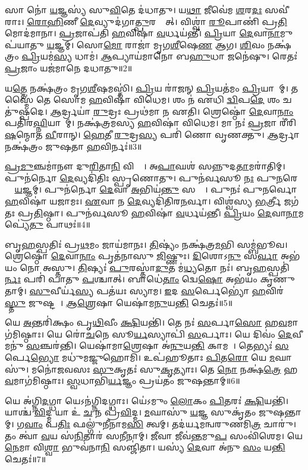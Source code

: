 𑌸𑌾 𑌨𑍋॑ \ul{𑌯}𑌜𑍍𑌞𑌸𑍍𑌯॑ 𑌸𑍁\ul{𑌵𑌿}𑌤𑍇 𑌦॑𑌧𑌾𑌤𑍁।
𑌯\ul{𑌥𑌾} 𑌜𑍀𑌵𑍇॑𑌮 \ul{𑌶}𑌰\ul{𑌦𑌃} 𑌸𑌵𑍀॑𑌰𑌾𑌃।
\ul{𑌰𑍋}\ul{𑌹𑌿}𑌣𑍀 \ul{𑌦𑍇}𑌵𑍍𑌯𑍁𑌦॑𑌗𑌾\ul{𑌤𑍍𑌪𑍁}𑌰𑌸𑍍𑌤𑌾᳚𑌤𑍍।
𑌵𑌿𑌶𑍍𑌵𑌾॑ \ul{𑌰𑍂}𑌪𑌾𑌣𑌿॑ 𑌪𑍍𑌰\ul{𑌤𑌿}𑌮𑍋𑌦॑𑌮𑌾𑌨𑌾।
\ul{𑌪𑍍𑌰}𑌜𑌾𑌪॑𑌤𑌿 \ul{𑌹}𑌵𑌿𑌷𑌾॑ \ul{𑌵}𑌰𑍍𑌧𑌯॑𑌨𑍍𑌤𑍀।
\ul{𑌪𑍍𑌰𑌿}𑌯𑌾 \ul{𑌦𑍇}𑌵𑌾\ul{𑌨𑌾}𑌮𑍁𑌪॑𑌯𑌾𑌤𑍁 \ul{𑌯}𑌜𑍍𑌞𑌮𑍍।
𑌸𑍋\ul{𑌮𑍋} 𑌰𑌾𑌜𑌾॑ 𑌮𑍃𑌗\ul{𑌶𑍀}\ar{}𑌷𑍇\ul{𑌣} 𑌆𑌗\sn{}।
\ul{𑌶𑌿}𑌵𑌂 𑌨𑌕𑍍𑌷॑𑌤𑍍𑌰𑌂 \ul{𑌪𑍍𑌰𑌿}𑌯𑌮॑\ul{𑌸𑍍𑌯} 𑌧𑌾𑌮॑।
\ul{𑌆}𑌪𑍍𑌯𑌾𑌯॑𑌮𑌾𑌨𑍋 𑌬\ul{𑌹𑍁}𑌧𑌾 𑌜𑌨𑍇॑𑌷𑍁।
𑌰𑍇𑌤𑌃॑ \ul{𑌪𑍍𑌰}𑌜𑌾𑌂 𑌯𑌜॑𑌮𑌾𑌨𑍇 𑌦𑌧𑌾𑌤𑍁॥2॥

𑌯\ul{𑌤𑍍𑌤𑍇} 𑌨𑌕𑍍𑌷॑𑌤𑍍𑌰𑌂 𑌮𑍃𑌗\ul{𑌶𑍀}\ar{}𑌷𑌮𑌸𑍍𑌤𑌿॑।
\ul{𑌪𑍍𑌰𑌿}𑌯 𑌰𑌾॑𑌜𑌨𑍍 \ul{𑌪𑍍𑌰𑌿}𑌯𑌤॑𑌮𑌂 \ul{𑌪𑍍𑌰𑌿}𑌯𑌾𑌣𑌾᳚𑌮𑍍।
𑌤𑌸𑍍𑌮𑍈॑ 𑌤𑍇 𑌸𑍋𑌮 \ul{𑌹}𑌵𑌿𑌷𑌾॑ 𑌵𑌿𑌧𑍇𑌮।
𑌶𑌂 𑌨॑ 𑌏𑌧𑌿 \ul{𑌦𑍍𑌵𑌿}𑌪\ul{𑌦𑍇} 𑌶𑌂 𑌚𑌤𑍁॑𑌷𑍍𑌪𑌦𑍇।
\ul{𑌆}𑌰𑍍𑌦𑍍𑌰𑌯𑌾॑ \ul{𑌰𑍁}𑌦𑍍𑌰𑌃 𑌪𑍍𑌰𑌥॑𑌮𑌾 𑌨 𑌏𑌤𑌿।
𑌶𑍍𑌰𑍇𑌷𑍍𑌠𑍋॑ \ul{𑌦𑍇}𑌵𑌾\ul{𑌨𑌾𑌂} 𑌪𑌤𑌿॑𑌰\ul{𑌘𑍍𑌨𑌿}𑌯𑌾𑌨𑌾᳚𑌮𑍍।
𑌨𑌕𑍍𑌷॑𑌤𑍍𑌰𑌮𑌸𑍍𑌯 \ul{𑌹}𑌵𑌿𑌷𑌾॑ 𑌵𑌿𑌧𑍇𑌮।
𑌮𑌾 𑌨𑌃॑ \ul{𑌪𑍍𑌰}𑌜𑌾 𑌰𑍀॑𑌰𑌿\ul{𑌷}𑌨𑍍𑌮𑍋𑌤 \ul{𑌵𑍀}𑌰𑌾𑌨𑍍।
\ul{𑌹𑍇}𑌤𑍀 \ul{𑌰𑍁}𑌦𑍍𑌰\ul{𑌸𑍍𑌯} 𑌪𑌰𑌿॑ 𑌣𑍋 𑌵𑍃𑌣𑌕𑍍𑌤𑍁।
\ul{𑌆}𑌰𑍍𑌦𑍍𑌰𑌾 𑌨𑌕𑍍𑌷॑𑌤𑍍𑌰𑌂 𑌜𑍁𑌷𑌤𑌾 \ul{𑌹}𑌵𑌿𑌰𑍍𑌨𑌃॑॥3॥

\ul{𑌪𑍍𑌰}\ul{𑌮𑍁}𑌞𑍍𑌚𑌮𑌾॑𑌨𑍗 𑌦𑍁\ul{𑌰𑌿}𑌤𑌾\ul{𑌨𑌿} 𑌵𑌿𑌶𑍍𑌵𑌾᳚।
𑌅\ul{𑌪𑌾}𑌘𑌶॑ 𑌸𑌨𑍍𑌨𑍁𑌦\ul{𑌤𑌾}𑌮𑌰𑌾॑𑌤𑌿𑌮𑍍।
𑌪𑍁𑌨॑𑌰𑍍𑌨𑍋 \ul{𑌦𑍇}𑌵𑍍𑌯𑌦𑌿॑𑌤𑌿𑌃 𑌸𑍍𑌪𑍃𑌣𑍋𑌤𑍁।
𑌪𑍁𑌨॑𑌰𑍍𑌵𑌸𑍂 \ul{𑌨𑌃} 𑌪𑍁\ul{𑌨}𑌰𑍇𑌤𑌾𑌂᳚ \ul{𑌯}𑌜𑍍𑌞𑌮𑍍।
𑌪𑍁𑌨॑𑌰𑍍𑌨𑍋 \ul{𑌦𑍇}𑌵𑌾 \ul{𑌅}𑌭𑌿𑌯॑\ul{𑌨𑍍𑌤𑍁} 𑌸𑌰𑍍𑌵𑍇᳚।
𑌪𑍁𑌨𑌃॑ 𑌪𑍁𑌨𑌰𑍍𑌵𑍋 \ul{𑌹}𑌵𑌿𑌷𑌾॑ 𑌯𑌜𑌾𑌮𑌃।
\ul{𑌏}𑌵𑌾 𑌨 \ul{𑌦𑍇}𑌵𑍍𑌯𑌦𑌿॑𑌤𑌿𑌰\ul{𑌨}𑌰𑍍𑌵𑌾।
𑌵𑌿𑌶𑍍𑌵॑𑌸𑍍𑌯 \ul{𑌭}𑌰𑍍𑌤𑍍𑌰𑍀 𑌜𑌗॑𑌤𑌃 𑌪𑍍𑌰\ul{𑌤𑌿}𑌷𑍍𑌠𑌾।
𑌪𑍁𑌨॑𑌰𑍍𑌵𑌸𑍂 \ul{𑌹}𑌵𑌿𑌷𑌾॑ \ul{𑌵}𑌰𑍍𑌧𑌯॑𑌨𑍍𑌤𑍀।
\ul{𑌪𑍍𑌰𑌿}𑌯𑌂 \ul{𑌦𑍇}𑌵𑌾\ul{𑌨𑌾}𑌮𑌪𑍍𑌯𑍇॑\ul{𑌤𑍁} 𑌪𑌾𑌥𑌃॑॥4॥

𑌬𑍃\ul{𑌹}𑌸𑍍𑌪𑌤𑌿𑌃॑ 𑌪𑍍𑌰\ul{𑌥}𑌮𑌂 𑌜𑌾𑌯॑𑌮𑌾𑌨𑌃।
\ul{𑌤𑌿}𑌷𑍍𑌯𑌂॑ 𑌨𑌕𑍍𑌷॑𑌤𑍍𑌰\ul{𑌮}𑌭𑌿 𑌸𑌮𑍍𑌬॑𑌭𑍂𑌵।
𑌶𑍍𑌰𑍇𑌷𑍍𑌠𑍋॑ \ul{𑌦𑍇}𑌵𑌾\ul{𑌨𑌾𑌂} 𑌪𑍃𑌤॑𑌨𑌾𑌸𑍁 \ul{𑌜𑌿}𑌷𑍍𑌣𑍁𑌃।
\ul{𑌦𑌿}𑌶𑍋𑌽\ul{𑌨𑍁} 𑌸\ul{𑌰𑍍𑌵𑌾} 𑌅𑌭॑𑌯𑌂 𑌨𑍋 𑌅𑌸𑍍𑌤𑍁।
\ul{𑌤𑌿}𑌷𑍍𑌯𑌃॑ \ul{𑌪𑍁}𑌰𑌸𑍍𑌤𑌾॑\ul{𑌦𑍁}𑌤 𑌮॑\ul{𑌧𑍍𑌯}𑌤𑍋 𑌨𑌃॑।
𑌬𑍃\ul{𑌹}𑌸𑍍𑌪𑌤𑌿॑\ul{𑌰𑍍𑌨𑌃} 𑌪𑌰𑌿॑ 𑌪𑌾𑌤𑍁 \ul{𑌪}𑌶𑍍𑌚𑌾𑌤𑍍।
𑌬𑌾𑌧𑍇॑\ul{𑌤𑌾𑌂} 𑌦𑍍𑌵𑍇\ul{𑌷𑍋} 𑌅𑌭॑𑌯𑌂 𑌕𑍃𑌣𑍁𑌤𑌾𑌮𑍍।
\ul{𑌸𑍁}𑌵𑍀𑌰𑍍𑌯॑\ul{𑌸𑍍𑌯} 𑌪𑌤॑𑌯𑌃 𑌸𑍍𑌯𑌾𑌮।
\ul{𑌇}𑌦 \ul{𑌸}𑌰𑍍𑌪𑍇𑌭𑍍𑌯𑍋॑ \ul{𑌹}𑌵𑌿𑌰॑\ul{𑌸𑍍𑌤𑍁} 𑌜𑍁𑌷𑍍𑌟𑌮𑍍᳚।
\ul{𑌆}\ul{𑌶𑍍𑌰𑍇}𑌷𑌾 𑌯𑍇𑌷𑌾॑𑌮\ul{𑌨𑍁}𑌯\ul{𑌨𑍍𑌤𑌿} 𑌚𑍇𑌤𑌃॑॥5॥

𑌯𑍇 \ul{𑌅}𑌨𑍍𑌤𑌰𑌿॑𑌕𑍍𑌷𑌂 𑌪𑍃\ul{𑌥𑌿}𑌵𑍀𑌂 \ul{𑌕𑍍𑌷𑌿}𑌯𑌨𑍍𑌤𑌿॑।
𑌤𑍇 𑌨𑌃॑ \ul{𑌸}𑌰𑍍𑌪𑌾\ul{𑌸𑍋} 𑌹\ul{𑌵}𑌮𑌾𑌗॑𑌮𑌿𑌷𑍍𑌠𑌾𑌃।
𑌯𑍇 𑌰𑍋॑\ul{𑌚}𑌨𑍇 𑌸𑍂\ul{𑌰𑍍𑌯}𑌸𑍍𑌯𑌾𑌪𑌿॑ \ul{𑌸}𑌰𑍍𑌪𑌾𑌃।
𑌯𑍇 𑌦𑌿𑌵𑌂॑ \ul{𑌦𑍇}𑌵𑍀𑌮𑌨𑍁॑ \ul{𑌸}𑌞𑍍𑌚𑌰॑𑌨𑍍𑌤𑌿।
𑌯𑍇𑌷𑌾॑𑌮𑌾\ul{𑌶𑍍𑌰𑍇}𑌷𑌾 𑌅॑\ul{𑌨𑍁}𑌯\ul{𑌨𑍍𑌤𑌿} 𑌕𑌾𑌮𑌮𑍍᳚।
𑌤𑍇𑌭𑍍𑌯𑌃॑ \ul{𑌸}𑌰𑍍𑌪𑍇\ul{𑌭𑍍𑌯𑍋} 𑌮𑌧𑍁॑𑌮𑌜𑍍𑌜𑍁𑌹𑍋𑌮𑌿।
𑌉𑌪॑𑌹𑍂𑌤𑌾𑌃 \ul{𑌪𑌿}𑌤\ul{𑌰𑍋} 𑌯𑍇 \ul{𑌮}𑌘𑌾𑌸𑍁॑।
𑌮𑌨𑍋॑𑌜𑌵𑌸𑌃 \ul{𑌸𑍁}𑌕𑍃𑌤𑌃॑ 𑌸𑍁\ul{𑌕𑍃}𑌤𑍍𑌯𑌾𑌃।
𑌤𑍇 \ul{𑌨𑍋} 𑌨𑌕𑍍𑌷॑\ul{𑌤𑍍𑌰𑍇} 𑌹\ul{𑌵}𑌮𑌾𑌗॑𑌮𑌿𑌷𑍍𑌠𑌾𑌃।
\ul{𑌸𑍍𑌵}𑌧𑌾𑌭𑌿॑\ul{𑌰𑍍𑌯}𑌜𑍍𑌞𑌂 𑌪𑍍𑌰𑌯॑𑌤𑌂 𑌜𑍁𑌷𑌨𑍍𑌤𑌾𑌮𑍍॥6॥

𑌯𑍇 𑌅॑𑌗𑍍𑌨𑌿\ul{𑌦}𑌗𑍍𑌧𑌾 𑌯𑍇𑌽𑌨॑𑌗𑍍𑌨𑌿𑌦𑌗𑍍𑌧𑌾𑌃।
𑌯𑍇॑𑌽𑌮𑍁𑌂 \ul{𑌲𑍋}𑌕𑌂 \ul{𑌪𑌿}𑌤𑌰𑌃॑ \ul{𑌕𑍍𑌷𑌿}𑌯𑌨𑍍𑌤𑌿॑।
𑌯𑌾𑌶𑍍𑌚॑ \ul{𑌵𑌿}𑌦𑍍𑌮 𑌯𑌾 𑌉॑ \ul{𑌚} 𑌨 𑌪𑍍𑌰॑\ul{𑌵𑌿}𑌦𑍍𑌮।
\ul{𑌮}𑌘𑌾𑌸𑍁॑ \ul{𑌯}𑌜𑍍𑌞 𑌸𑍁𑌕𑍃॑𑌤𑌂 𑌜𑍁𑌷𑌨𑍍𑌤𑌾𑌮𑍍।
𑌗\ul{𑌵𑌾𑌂} 𑌪\ul{𑌤𑌿𑌃} 𑌫𑌲𑍍𑌗𑍁॑𑌨𑍀𑌨𑌾𑌮\ul{𑌸𑌿} 𑌤𑍍𑌵𑌮𑍍।
𑌤𑌦॑𑌰𑍍𑌯𑌮𑌨𑍍𑌵𑌰𑍁𑌣𑌮𑌿\ul{𑌤𑍍𑌰} 𑌚𑌾𑌰𑍁॑।
𑌤𑌂 𑌤𑍍𑌵𑌾॑ \ul{𑌵}𑌯 𑌸॑\ul{𑌨𑌿}𑌤𑌾𑌰॑ 𑌸\ul{𑌨𑍀}𑌨𑌾𑌮𑍍।
\ul{𑌜𑍀}𑌵𑌾 𑌜𑍀𑌵॑\ul{𑌨𑍍𑌤}𑌮𑍁\ul{𑌪} 𑌸𑌂𑌵𑌿॑𑌶𑍇𑌮।
𑌯𑍇\ul{𑌨𑍇}𑌮𑌾 𑌵𑌿\ul{𑌶𑍍𑌵𑌾} 𑌭𑍁𑌵॑𑌨𑌾\ul{𑌨𑌿} 𑌸𑌞𑍍𑌜𑌿॑𑌤𑌾।
𑌯𑌸𑍍𑌯॑ \ul{𑌦𑍇}𑌵𑌾 𑌅॑𑌨𑍁 \ul{𑌸𑌂} 𑌯\ul{𑌨𑍍𑌤𑌿} 𑌚𑍇𑌤𑌃॑॥7॥

